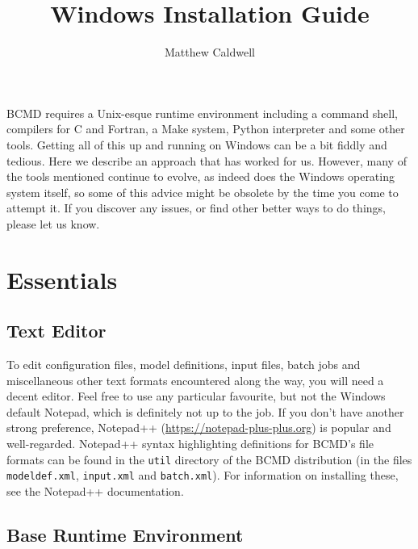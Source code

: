 \documentclass[a4paper,11pt]{article}
\title{Windows Installation Guide}
\author{Matthew Caldwell}
\begin{document}
\maketitle

BCMD requires a Unix-esque runtime environment including a command shell, compilers for C and Fortran, a Make system, Python interpreter and some other tools. Getting all of this up and running on Windows can be a bit fiddly and tedious. Here we describe an approach that has worked for us. However, many of the tools mentioned continue to evolve, as indeed does the Windows operating system itself, so some of this advice might be obsolete by the time you come to attempt it. If you discover any issues, or find other better ways to do things, please let us know.

\section{Essentials}\label{essentials}

\subsection{Text Editor}

To edit configuration files, model definitions, input files, batch jobs and miscellaneous other text formats encountered along the way, you will need a decent editor. Feel free to use any particular favourite, but not the Windows default Notepad, which is definitely not up to the job. If you don't have another strong preference, Notepad++ (\url{https://notepad-plus-plus.org}) is popular and well-regarded. Notepad++ syntax highlighting definitions for BCMD's file formats can be found in the \texttt{util} directory of the BCMD distribution (in the files \texttt{modeldef.xml}, \texttt{input.xml} and \texttt{batch.xml}). For information on installing these, see the Notepad++ documentation.

\subsection{Base Runtime Environment}\label{basics}
\end{document}

